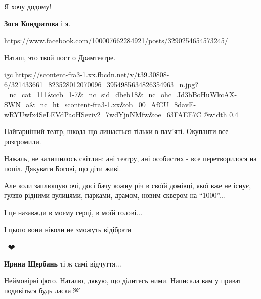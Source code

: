  
 
 
 
 


Я хочу додому!

\textbf{Зося Кондратова} і я.


\url{https://www.facebook.com/100007662284921/posts/3290254654573245/}


Наташ, это твой пост о Драмтеатре.


\ifcmt
  igc https://scontent-fra3-1.xx.fbcdn.net/v/t39.30808-6/321433661_823528012070096_3954985634826354963_n.jpg?_nc_cat=111&ccb=1-7&_nc_sid=dbeb18&_nc_ohc=Jd3bBoHuWkcAX-SWN_a&_nc_ht=scontent-fra3-1.xx&oh=00_AfCU_8davE-wRYUwfx4SeLEVdPaoHSeziv2_7wdYjnNMfw&oe=63FAEE7C
	@width 0.4
\fi


Найгарніший театр, шкода що лишається тільки в пам'яті. Окупанти все розгромили.


Нажаль, не залишилось світлин: ані театру, ані особистих - все перетворилося на
попіл. Дякувати Богові, що діти живі.

Але коли заплющую очі, досі бачу кожну річ в своїй домівці, якої вже не існує,
гуляю рідними вулицями, парками, драмом, новим сквером на \enquote{1000}...

І це назавжди в моєму серці, в моїй голові...

І цього вони ніколи не зможуть відібрати

💙💛❤️

\begin{itemize} %
\textbf{Ирина Щербань} ті ж самі відчуття...
\end{itemize} %


Неймовірні фото. Наталю, дякую, що ділитесь ними. Написала вам у приват
подивіться будь ласка ￼

